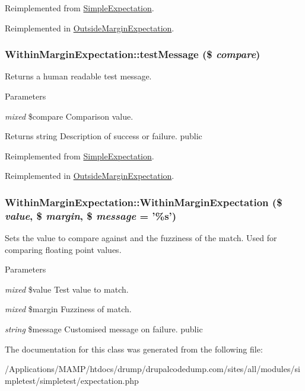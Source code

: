 Reimplemented from \hyperlink{class_simple_expectation_aa2b98f827e7487ebe12cedb9ad39d061}{SimpleExpectation}.

Reimplemented in \hyperlink{class_outside_margin_expectation_a6c68e08230af88b7cf33445bbc2ff24f}{OutsideMarginExpectation}.\hypertarget{class_within_margin_expectation_a4b2f6fda3d30a50c3b3ce003520262c8}{
\subsubsection[{testMessage}]{\setlength{\rightskip}{0pt plus 5cm}WithinMarginExpectation::testMessage (\$ {\em compare})}}
\label{class_within_margin_expectation_a4b2f6fda3d30a50c3b3ce003520262c8}
Returns a human readable test message. 
\begin{DoxyParams}{Parameters}
\item[{\em mixed}]\$compare Comparison value. \end{DoxyParams}
\begin{DoxyReturn}{Returns}
string Description of success or failure.  public 
\end{DoxyReturn}


Reimplemented from \hyperlink{class_simple_expectation_a15b69edf659c76f6543aa98d8d85b025}{SimpleExpectation}.

Reimplemented in \hyperlink{class_outside_margin_expectation_a62179c3675f6db8e4e41d7fffc32acfd}{OutsideMarginExpectation}.\hypertarget{class_within_margin_expectation_a6bd172519fd6aaa9eba71f96d1f48621}{
\subsubsection[{WithinMarginExpectation}]{\setlength{\rightskip}{0pt plus 5cm}WithinMarginExpectation::WithinMarginExpectation (\$ {\em value}, \/  \$ {\em margin}, \/  \$ {\em message} = {\ttfamily '\%s'})}}
\label{class_within_margin_expectation_a6bd172519fd6aaa9eba71f96d1f48621}
Sets the value to compare against and the fuzziness of the match. Used for comparing floating point values. 
\begin{DoxyParams}{Parameters}
\item[{\em mixed}]\$value Test value to match. \item[{\em mixed}]\$margin Fuzziness of match. \item[{\em string}]\$message Customised message on failure.  public \end{DoxyParams}


The documentation for this class was generated from the following file:\begin{DoxyCompactItemize}
\item 
/Applications/MAMP/htdocs/drump/drupalcodedump.com/sites/all/modules/simpletest/simpletest/expectation.php\end{DoxyCompactItemize}
